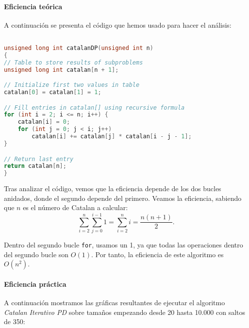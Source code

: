 \documentclass[a4paper,12pt]{article} %
\begin{document}
\paragraph{Eficiencia teórica}

A continuación se presenta el código que hemos usado para hacer el análisis:

\begin{lstlisting}[language=C, caption={Código de Catalan iterativo (programación dinámica)}]

unsigned long int catalanDP(unsigned int n)
{
// Table to store results of subproblems
unsigned long int catalan[n + 1];

// Initialize first two values in table
catalan[0] = catalan[1] = 1;

// Fill entries in catalan[] using recursive formula
for (int i = 2; i <= n; i++) {
	catalan[i] = 0;
	for (int j = 0; j < i; j++)
		catalan[i] += catalan[j] * catalan[i - j - 1];
}

// Return last entry
return catalan[n];
}	
	\end{lstlisting}

Tras analizar el código, vemos que la eficiencia depende de los dos bucles anidados, donde el
segundo depende del primero. Veamos la eficiencia, sabiendo que \(n\) es el número de Catalan a calcular:
\[
	\sum_{i=2}^{n} \sum_{j=0}^{i-1} 1 = \sum_{i=2}^{n} i = \frac{n(n+1)}{2}.
\]

Dentro del segundo bucle \texttt{for}, usamos un 1, ya que todas las operaciones dentro del segundo
bucle son \(\textit{O}(1)\). Por tanto, la eficiencia de este algoritmo es \(\textit{O}(n^2)\).
\paragraph{Eficiencia práctica}

A continuación mostramos las gráficas resultantes de ejecutar el algoritmo \textit{Catalan Iterativo PD}
sobre tamaños empezando desde 20 hasta 10.000 con saltos de 350:
\end{document}
